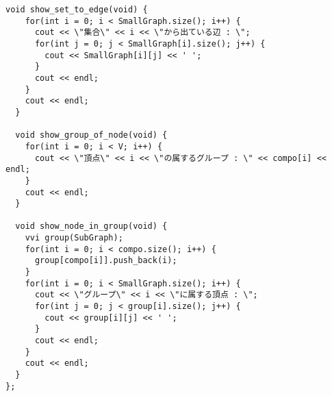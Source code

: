 \documentclass[a4j,titlepage]{jarticle} %
\begin{document}
\begin{lstlisting}[caption=StronglyConnectedComponent]
  void show_set_to_edge(void) {
    for(int i = 0; i < SmallGraph.size(); i++) {
      cout << \"集合\" << i << \"から出ている辺 : \";
      for(int j = 0; j < SmallGraph[i].size(); j++) {
        cout << SmallGraph[i][j] << ' ';
      }
      cout << endl;
    }
    cout << endl;
  }

  void show_group_of_node(void) {
    for(int i = 0; i < V; i++) {
      cout << \"頂点\" << i << \"の属するグループ : \" << compo[i] << endl;
    }
    cout << endl;
  }

  void show_node_in_group(void) {
    vvi group(SubGraph);
    for(int i = 0; i < compo.size(); i++) {
      group[compo[i]].push_back(i);
    }
    for(int i = 0; i < SmallGraph.size(); i++) {
      cout << \"グループ\" << i << \"に属する頂点 : \";
      for(int j = 0; j < group[i].size(); j++) {
        cout << group[i][j] << ' ';
      }
      cout << endl;
    }
    cout << endl;
  }
};

\end{lstlisting}

\color{white}
\end{document}

